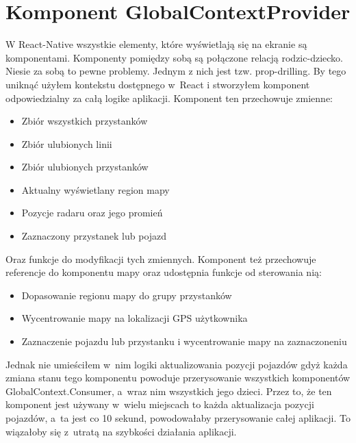 \documentclass{SGGW-thesis}
\begin{document}
\section{Komponent GlobalContextProvider}
W React-Native wszystkie elementy, które wyświetlają się na ekranie są komponentami.
Komponenty pomiędzy sobą są połączone relacją rodzic-dziecko.
Niesie za sobą to pewne problemy.
Jednym z nich jest tzw. prop-drilling. %
By tego uniknąć użyłem kontekstu dostępnego w~React i stworzyłem komponent  odpowiedzialny za całą logike aplikacji.
Komponent ten przechowuje zmienne:
\begin{itemize}
  \item{Zbiór wszystkich przystanków}
  \item{Zbiór ulubionych linii}
  \item{Zbiór ulubionych przystanków}
  \item{Aktualny wyświetlany region mapy}
  \item{Pozycje radaru oraz jego promień}
  \item{Zaznaczony przystanek lub pojazd}
\end{itemize}
Oraz funkcje do modyfikacji tych zmiennych. %
Komponent też przechowuje referencje do komponentu mapy oraz udostępnia funkcje od sterowania nią:
\begin{itemize}
  \item{Dopasowanie regionu mapy do grupy przystanków}
  \item{Wycentrowanie mapy na lokalizacji GPS użytkownika}
  \item{Zaznaczenie pojazdu lub przystanku i wycentrowanie mapy na zaznaczoneniu}
\end{itemize}

Jednak nie umieściłem w~nim logiki aktualizowania pozycji pojazdów gdyż każda zmiana stanu
tego komponentu powoduje przerysowanie wszystkich komponentów GlobalContext.Consumer, a~wraz nim wszystkich jego dzieci.
Przez to, że ten komponent jest używany w~wielu miejscach to każda aktualizacja pozycji pojazdów, a~ta
jest co 10 sekund, powodowałaby przerysowanie całej aplikacji.
To wiązałoby się z~utratą na szybkości działania aplikacji.
\end{document}
